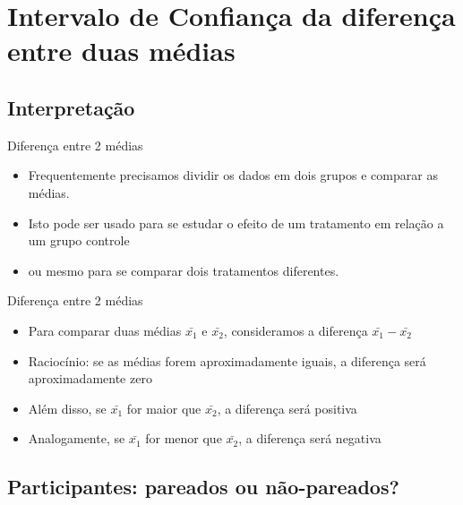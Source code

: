 \documentclass{beamer}
\begin{document}
\section[IC diferença 2 médias]{Intervalo de Confiança da diferença entre duas médias}

\subsection{Interpretação}

\begin{frame}{Diferença entre 2 médias}
  \begin{itemize}
  \item Frequentemente precisamos dividir os dados em dois grupos e
    comparar as médias.
  \item Isto pode ser usado para se estudar o efeito de um tratamento
    em relação a um grupo controle
  \item ou mesmo para se comparar dois tratamentos diferentes.
  \end{itemize}
\end{frame}

\begin{frame}{Diferença entre 2 médias}
  \begin{itemize}
  \item Para comparar duas médias $\bar{x_1}$ e $\bar{x_2}$, consideramos a diferença $\bar{x_1} - \bar{x_2}$
  \item Raciocínio: se as médias forem aproximadamente iguais, a
    diferença será aproximadamente zero
  \item Além disso, se $\bar{x_1}$ for maior que $\bar{x_2}$, a diferença será positiva
  \item Analogamente, se $\bar{x_1}$ for menor que $\bar{x_2}$, a diferença será negativa
  \end{itemize}
\end{frame}

\subsection{Participantes: pareados ou não-pareados?}
\end{document}
